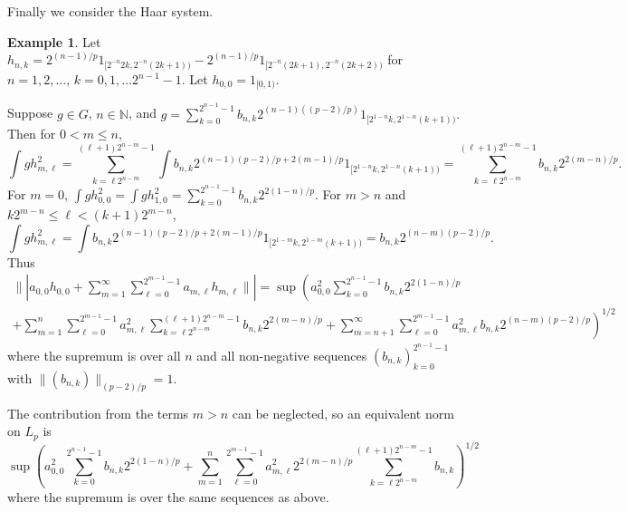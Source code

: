 \documentclass[12pt]{amsart}
\theoremstyle{definition}
\newtheorem{example}[theorem]{Example}
\theoremstyle{remark}
\numberwithin{equation}{section}
\begin{document}
Finally we consider the Haar system. 
\begin{example}
Let
$h_{n,k} = 2^{(n-1)/p}1_{[2^{-n}2k,2^{-n}(2k+1))}-
2^{(n-1)/p}1_{[2^{-n}(2k+1),2^{-n}(2k+2))}$ for $n= 1,2, \dots $, $k = 0,
1, \dots 2^{n-1}-1.$ Let $h_{0,0} =1_{[0,1)}.$

Suppose $g \in G$, $n\in \mathbb N$, and $g =
\sum_{k=0}^{2^{n-1}-1}b_{n,k}2^{(n-1)((p-2)/p)}1_{[2^{1-n}k,2^{1-n}(k+1))}.$ Then
for $0<m \le n$,
$$\int g h_{m,\ell}^2 = \sum_{k=\ell2^{n-m}}^{(\ell+1)2^{n-m}-1}
\int
b_{n,k}2^{(n-1)(p-2)/p+2(m-1)/p}1_{[2^{1-n}k,2^{1-n}(k+1))}
=\sum_{k=\ell 2^{n-m}}^{(\ell+1)2^{n-m}-1} b_{n,k}2^{2(m-n)/p}.$$
For $m=0$, $\int g h_{0,0}^2= \int g h_{1,0}^2=\sum_{k=0
}^{2^{n-1}-1} b_{n,k}2^{2(1-n)/p}.$
For $m>n$ and \newline
$k 2^{m-n}\le \ell <(k+1)2^{m-n}$,
$$\int g h_{m,\ell}^2 = \int
b_{n,k}2^{(n-1)(p-2)/p+2(m-1)/p}1_{[2^{1-m}k,2^{1-m}(k+1))}
= b_{n,k} 2^{(n-m)(p-2)/p}.$$
Thus
\begin{multline*} \|| a_{0,0}h_{0,0}+\sum_{m=1}^\infty \sum_{\ell=0}^{2^{m-1}-1}
a_{m,\ell} h_{m,\ell}\||
=\sup\left (
a_{0,0}^2\sum_{k=0
}^{2^{n-1}-1} b_{n,k}2^{2(1-n)/p}\right . \\
\left .+\sum_{m=1}^n \sum_{\ell=0}^{2^{m-1}-1}
a_{m,\ell}^2 \sum_{k=\ell
2^{n-m}}^{(\ell+1)2^{n-m}-1} b_{n,k}2^{2(m-n)/p}+\sum_{m=n+1}^\infty
\sum_{\ell=0}^{2^{m-1}-1}
a_{m,\ell}^2 b_{n,k} 2^{(n-m)(p-2)/p}\right )^{1/2}
\end{multline*}
where the supremum is over all $n$ and all non-negative
sequences
$(b_{n,k})_{k=0}^{2^{n-1}-1}$\newline
 with $\|(b_{n,k})\|_{(p-2)/p}
=1.$

The contribution from the terms $m>n$ can be neglected,
so an equivalent norm on $L_p$ is 
$$\sup \left (a_{0,0}^2\sum_{k=0
}^{2^{n-1}-1} b_{n,k}2^{2(1-n)/p}+ \sum_{m=1}^n \sum_{\ell=0}^{2^{m-1}-1} a_{m,\ell}^2
2^{2(m-n)/p}\sum_{k=\ell 2^{n-m}}^{(\ell+1)2^{n-m}-1} b_{n,k}\right
)^{1/2}$$
where the supremum is over the same sequences as above.
\end{example}


\end{document}
